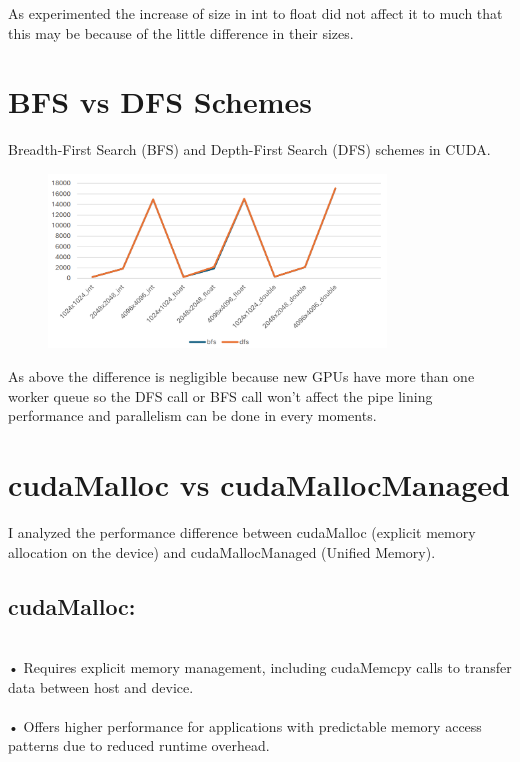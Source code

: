 \documentclass{article}
\begin{document}
As experimented the increase of size in int to float did not affect it to much that this may be because of the little difference in their sizes.


\section{BFS vs DFS Schemes}
Breadth-First Search (BFS) and Depth-First Search (DFS) schemes in CUDA.

\begin{figure}[h!]
    \centering
    \includegraphics[width=0.8\textwidth]{5.png}
\end{figure}

As above the difference is negligible because new GPUs have more than one worker queue so the DFS call or BFS call won’t affect the pipe lining performance and parallelism can be done in every moments.


\section{cudaMalloc vs cudaMallocManaged}

I analyzed the performance difference between cudaMalloc (explicit memory allocation 
on the device) and cudaMallocManaged (Unified Memory).



\subsection{cudaMalloc:}

\\• Requires explicit memory management, including cudaMemcpy calls to transfer data between host and device. \\
\\• Offers higher performance for applications with predictable memory access patterns due to reduced runtime overhead. \\
\end{document}
